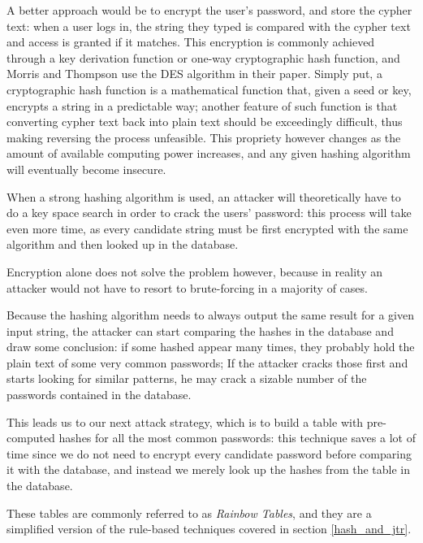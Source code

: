 A better approach would be to encrypt the user's password, and store the cypher text: when a user logs in, the string they typed is compared with the cypher text and access is granted if it matches. This encryption is commonly achieved through a key derivation function or one-way cryptographic hash function, and Morris and Thompson use the DES algorithm in their paper. %
Simply put, a cryptographic hash function is a mathematical function that, given a seed or key, encrypts a string in a predictable way; another feature of such function is that converting cypher text back into plain text should be exceedingly difficult, thus making reversing the process unfeasible.
This propriety however changes as the amount of available computing power increases, and any given hashing algorithm will eventually become insecure.

When a strong hashing algorithm is used, an attacker will theoretically have to do a key space search in order to crack the users' password: this process will take even more time, as every candidate string must be first encrypted with the same algorithm and then looked up in the database.

Encryption alone does not solve the problem however, because in reality an attacker would not have to resort to brute-forcing in a majority of cases.

Because the hashing algorithm needs to always output the same result for a given input string, the attacker can start comparing the hashes in the database and draw some conclusion: if some hashed appear many times, they probably hold the plain text of some very common passwords; If the attacker cracks those first and starts looking for similar patterns, he may crack a sizable number of the passwords contained in the database.

This leads us to our next attack strategy, which is to build a table with pre-computed hashes for all the most common passwords: this technique saves a lot of time since we do not need to encrypt every candidate password before comparing it with the database, and instead we merely look up the hashes from the table in the database. 

These tables are commonly referred to as \emph{Rainbow Tables}, and they are a simplified version of the rule-based techniques covered in section \ref{hash_and_jtr}.

